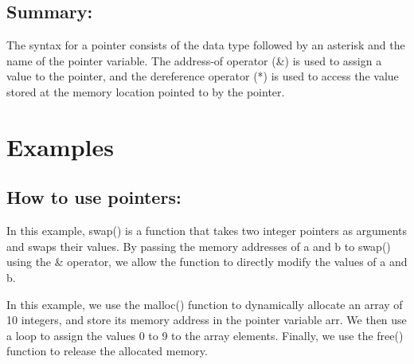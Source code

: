 \documentclass[12pt, letterpaper]{report}
\begin{document}
\subsection*{Summary:}
The syntax for a pointer consists of the data type followed by an asterisk
and the name of the pointer variable. The address-of operator (\&) is used 
to assign a value to the pointer, and the dereference operator (*) is 
used to access the value stored at the memory location pointed to by the 
pointer.

\newpage
\section{Examples}

\subsection{How to use pointers:}
In this example, swap() is a function that takes two integer pointers as 
arguments and swaps their values. By passing the memory addresses of a and b 
to swap() using the \& operator, we allow the function to directly modify the 
values of a and b.

\clearpage
In this example, we use the malloc() function to dynamically allocate an array 
of 10 integers, and store its memory address in the pointer variable arr. We 
then use a loop to assign the values 0 to 9 to the array elements. Finally, we
use the free() function to release the allocated memory.
\end{document}
